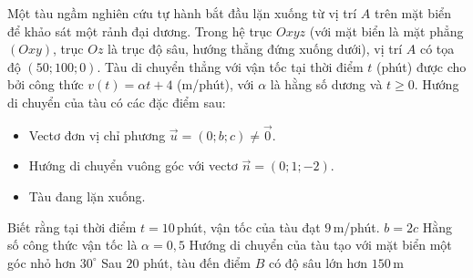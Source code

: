 \begin{ex}%
	Một tàu ngầm nghiên cứu tự hành bắt đầu lặn xuống từ vị trí $A$ trên mặt biển để khảo sát một rảnh đại dương. Trong hệ trục $Oxyz$ (với mặt biển là mặt phẳng $(Oxy)$, trục $Oz$ là trục độ sâu, hướng thẳng đứng xuống dưới), vị trí $A$ có tọa độ $(50;100;0)$. Tàu di chuyển thẳng với vận tốc tại thời điểm $t$ (phút) được cho bởi công thức $v(t)=\alpha t+4$ (m/phút), với $\alpha$ là hằng số dương và $t\ge 0$. Hướng di chuyển của tàu có các đặc điểm sau:
	\begin{itemize}
		\item Vectơ đơn vị chỉ phương $\overrightarrow{u}=(0;b;c)\ne \overrightarrow{0}$.
		\item Hướng di chuyển vuông góc với vectơ $\overrightarrow{n}=(0;1;-2)$.
		\item Tàu đang lặn xuống.
	\end{itemize}
	Biết rằng tại thời điểm $t=10$\,phút, vận tốc của tàu đạt $9$\,m/phút.
	\choiceTF
	{\True $b=2c$}
	{\True Hằng số công thức vận tốc là $\alpha=0{,}5$}
	{\True Hướng di chuyển của tàu tạo với mặt biển một góc nhỏ hơn $30^\circ$}
	{Sau $20$ phút, tàu đến điểm $B$ có độ sâu lớn hơn $150$\,m}
\end{ex}

